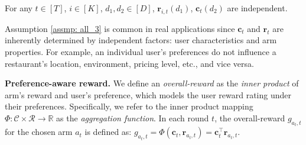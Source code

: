\begin{assumption}
[Independence]
\label{assmp: all_3}
For any $t \!\in\! [T]$, $i \!\in\! [K]$, $d_1,d_2 \!\in\! [D]$, $\boldsymbol{r}_{i,t}(d_1)$, $\boldsymbol{c}_t(d_2)$ are independent.
\end{assumption}

Assumption \ref{assmp: all_3} is common in real applications since $\boldsymbol{c}_t$ and $\boldsymbol{r}_t$ are inherently determined by independent factors: user characteristics and arm properties. For example, an individual user's preferences do not influence a restaurant's location, environment, pricing level, etc., and vice versa.




\textbf{Preference-aware reward.}
We define an \emph{overall-reward} as the \emph{inner product} of arm's reward and user's preference, which models the user reward rating under their preferences.
Specifically, we refer to the inner product mapping $\Phi: \mathcal{C} \times \mathcal{R} \rightarrow \mathbb{R}$ as the \emph{aggregation function}.
In each round $t$, the overall-reward $g_{a_t,t}$ for the chosen arm $a_t$ is defined as: 
$\textstyle
g_{a_t,t} = \Phi (\boldsymbol{c}_t, \boldsymbol{r}_{a_t, t}) 
= \boldsymbol{c}_t^{\top} \boldsymbol{r}_{a_t, t}$.


